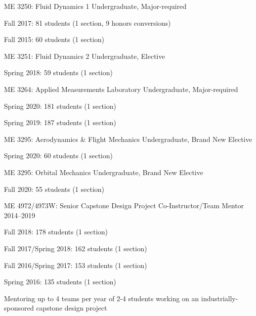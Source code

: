 \begin{outerlist}
    \item ME 3250: Fluid Dynamics 1 \hfill Undergraduate, Major-required
    \begin{innerlist}
        \item Fall 2017: 81 students (1 section, 9 honors conversions)
        \item Fall 2015: 60 students (1 section)
    \end{innerlist}

    \item ME 3251: Fluid Dynamics 2 \hfill Undergraduate, Elective
    \begin{innerlist}
        \item Spring 2018: 59 students (1 section)
    \end{innerlist}

    \item ME 3264: Applied Measurements Laboratory \hfill Undergraduate, Major-required
    \begin{innerlist}
        \item Spring 2020: 181 students (1 section)
        \item Spring 2019: 187 students (1 section)
    \end{innerlist}

    \item ME 3295: Aerodynamics \& Flight Mechanics \hfill Undergraduate, Brand New Elective
    \begin{innerlist}
        \item Spring 2020: 60 students (1 section)
    \end{innerlist}

    \item ME 3295: Orbital Mechanics \hfill Undergraduate, Brand New Elective
    \begin{innerlist}
        \item Fall 2020: 55 students (1 section)
    \end{innerlist}

    \item ME 4972/4973W: Senior Capstone Design Project Co-Instructor/Team Mentor \hfill 2014--2019
    \begin{innerlist}
        \item Fall 2018: 178 students (1 section)
        \item Fall 2017/Spring 2018: 162 students (1 section)
        \item Fall 2016/Spring 2017: 153 students (1 section)
        \item Spring 2016: 135 students (1 section)
        \item Mentoring up to 4 teams per year of 2-4 students working on an
        industrially-sponsored capstone design project
    \end{innerlist}


\end{outerlist}
